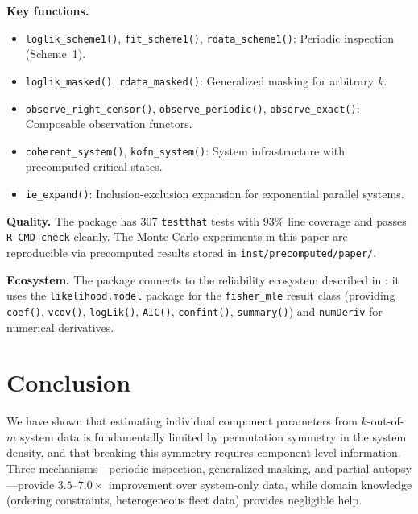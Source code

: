 \documentclass[12pt]{article}
\begin{document}
\textbf{Key functions.}
\begin{itemize}
  \item \texttt{loglik\_scheme1()}, \texttt{fit\_scheme1()},
    \texttt{rdata\_scheme1()}: Periodic inspection (Scheme~1).
  \item \texttt{loglik\_masked()}, \texttt{rdata\_masked()}: Generalized
    masking for arbitrary $k$.
  \item \texttt{observe\_right\_censor()}, \texttt{observe\_periodic()},
    \texttt{observe\_exact()}: Composable observation functors.
  \item \texttt{coherent\_system()}, \texttt{kofn\_system()}: System
    infrastructure with precomputed critical states.
  \item \texttt{ie\_expand()}: Inclusion-exclusion expansion for
    exponential parallel systems.
\end{itemize}

\textbf{Quality.}
The package has 307 \texttt{testthat} tests with 93\% line coverage and
passes \texttt{R CMD check} cleanly.  The Monte Carlo experiments in this
paper are reproducible via precomputed results stored in
\texttt{inst/precomputed/paper/}.

\textbf{Ecosystem.}
The package connects to the reliability ecosystem described in
\citet{MeekerEscobarPascual2022}: it uses the
\texttt{likelihood.model} package for the \texttt{fisher\_mle} result class
(providing \texttt{coef()}, \texttt{vcov()}, \texttt{logLik()},
\texttt{AIC()}, \texttt{confint()}, \texttt{summary()}) and
\texttt{numDeriv} \citep{numDeriv} for numerical derivatives.


\section{Conclusion}\label{sec:conclusion}

We have shown that estimating individual component parameters from
$k$-out-of-$m$ system data is fundamentally limited by permutation
symmetry in the system density, and that breaking this symmetry requires
component-level information.  Three mechanisms---periodic inspection,
generalized masking, and partial autopsy---provide $3.5$--$7.0\times$
improvement over system-only data, while domain knowledge (ordering
constraints, heterogeneous fleet data) provides negligible help.
\end{document}
